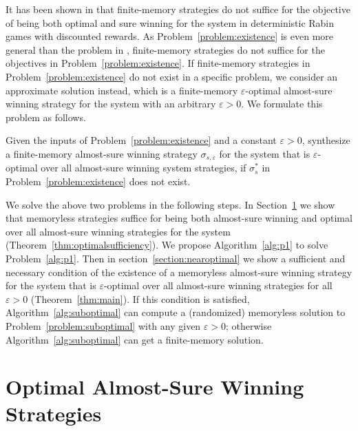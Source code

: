 \documentclass[runningheads,a4paper]{llncs}
\begin{document}
It has been shown in \cite{wen2015correct} that finite-memory strategies do not suffice for the objective of being both optimal and sure winning for the system in deterministic Rabin games with discounted rewards. As Problem~\ref{problem:existence} is even more general than the problem in \cite{wen2015correct}, finite-memory strategies do not suffice for the objectives in Problem~\ref{problem:existence}. If finite-memory strategies in Problem~\ref{problem:existence} do not exist in a specific problem, we consider an approximate solution instead, which is a finite-memory $\varepsilon$-optimal almost-sure winning strategy for the system with an arbitrary $\varepsilon > 0$. We formulate this problem as follows.

\begin{problem}
Given the inputs of Problem~\ref{problem:existence} and a constant $\varepsilon > 0$, synthesize a finite-memory almost-sure winning strategy $\sigma_{s,\varepsilon}$ for the system that is $\varepsilon$-optimal over all almost-sure winning system strategies, if $\sigma^*_s$ in Problem~\ref{problem:existence} does not exist. 
\label{problem:suboptimal}
\end{problem}



We solve the above two problems in the following steps. In Section~\ref{section:optimal} we show that memoryless strategies suffice for being both almost-sure winning and optimal over all almost-sure winning strategies for the system (Theorem~\ref{thm:optimalsufficiency}). We propose Algorithm~\ref{alg:p1} to solve Problem~\ref{alg:p1}. Then in section~\ref{section:nearoptimal} we show a sufficient and necessary condition of the existence of a memoryless almost-sure winning strategy for the system that is $\varepsilon$-optimal over all almost-sure winning strategies for all $\varepsilon > 0$ (Theorem~\ref{thm:main}). If this condition is satisfied, Algorithm~\ref{alg:suboptimal} can compute a (randomized) memoryless solution to Problem~\ref{problem:suboptimal} with any given $\varepsilon > 0$; otherwise Algorithm~\ref{alg:suboptimal} can get a finite-memory solution. 



\section{Optimal Almost-Sure Winning Strategies}
\label{section:optimal}
\end{document}
